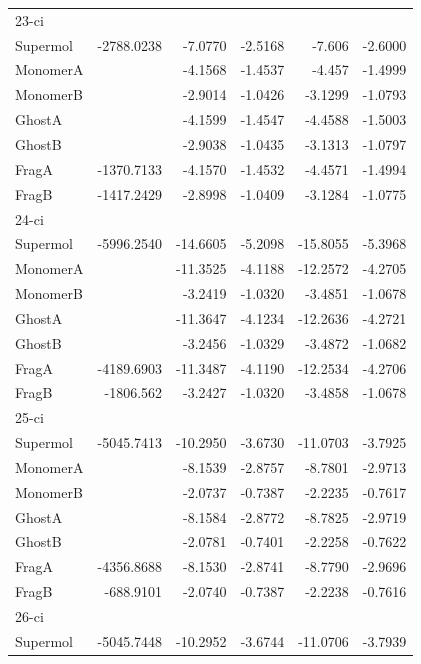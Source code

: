 \documentclass[journal=jctcce,manuscript=article]{achemso}
\begin{document}
\begin{spacing}{1}
\begin{longtable}{lRRRRR}
    23-ci &       &       &       &       &  \\
    Supermol & -2788.0238 & -7.0770 & -2.5168 & -7.606 & -2.6000 \\
    MonomerA &       & -4.1568 & -1.4537 & -4.457 & -1.4999 \\
    MonomerB &       & -2.9014 & -1.0426 & -3.1299 & -1.0793 \\
    GhostA &       & -4.1599 & -1.4547 & -4.4588 & -1.5003 \\
    GhostB &       & -2.9038 & -1.0435 & -3.1313 & -1.0797 \\
    FragA & -1370.7133 & -4.1570 & -1.4532 & -4.4571 & -1.4994 \\
    FragB & -1417.2429 & -2.8998 & -1.0409 & -3.1284 & -1.0775 \\
    24-ci &       &       &       &       &  \\
    Supermol & -5996.2540 & -14.6605 & -5.2098 & -15.8055 & -5.3968 \\
    MonomerA &       & -11.3525 & -4.1188 & -12.2572 & -4.2705 \\
    MonomerB &       & -3.2419 & -1.0320 & -3.4851 & -1.0678 \\
    GhostA &       & -11.3647 & -4.1234 & -12.2636 & -4.2721 \\
    GhostB &       & -3.2456 & -1.0329 & -3.4872 & -1.0682 \\
    FragA & -4189.6903 & -11.3487 & -4.1190 & -12.2534 & -4.2706 \\
    FragB & -1806.562 & -3.2427 & -1.0320 & -3.4858 & -1.0678 \\
    25-ci &       &       &       &       &  \\
    Supermol & -5045.7413 & -10.2950 & -3.6730 & -11.0703 & -3.7925 \\
    MonomerA &       & -8.1539 & -2.8757 & -8.7801 & -2.9713 \\
    MonomerB &       & -2.0737 & -0.7387 & -2.2235 & -0.7617 \\
    GhostA &       & -8.1584 & -2.8772 & -8.7825 & -2.9719 \\
    GhostB &       & -2.0781 & -0.7401 & -2.2258 & -0.7622 \\
    FragA & -4356.8688 & -8.1530 & -2.8741 & -8.7790 & -2.9696 \\
    FragB & -688.9101 & -2.0740 & -0.7387 & -2.2238 & -0.7616 \\
    26-ci &       &       &       &       &  \\
    Supermol & -5045.7448 & -10.2952 & -3.6744 & -11.0706 & -3.7939 \\

\end{longtable}
\end{spacing}
\end{document}
